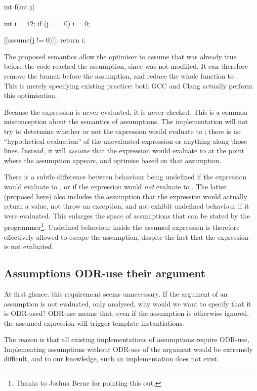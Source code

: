 \begin{codeblock}
int f(int j) {
  int i = 42;
  if (j == 0)
    i = 0;

  [[assume(j != 0)]];
  return i;
}
\end{codeblock}

The proposed semantics allow the optimiser to assume that  was already true before the code reached the assumption, since  was not modified. It can therefore remove the branch before the assumption, and reduce the whole function to . This is merely specifying existing practice: both GCC and Clang actually perform this optimisation.

Because the expression is never evaluated, it is never checked. This is a common misconception about the semantics of assumptions. The implementation will not try to determine whether or not the expression would evaluate to ; there is no ``hypothetical evaluation'' of the unevaluated expression or anything along those lines. Instead, it will \emph{assume} that the expression would evaluate to  at the point where the assumption appears, and optimise based on that assumption.

There is a subtle difference between behaviour being undefined if the expression would evaluate to , or if the expression would \emph{not} evaluate to . The latter (proposed here) also includes the assumption that the expression would actually return a value, not throw an exception, and not exhibit undefined behaviour if it were evaluated. This enlarges the space of assumptions that can be stated by the programmer\footnote{Thanks to Joshua Berne for pointing this out.}. Undefined behaviour inside the assumed expression is therefore effectively allowed to escape the assumption, despite the fact that the expression is not evaluated.

\subsection{Assumptions ODR-use their argument}

At first glance, this requirement seems unnecessary. If the argument of an assumption is not evaluated, only analysed, why would we want to specify that it is ODR-used? ODR-use means that, even if the assumption is otherwise ignored, the assumed expression will trigger template instantiations.

The reason is that all existing implementations of assumptions require ODR-use, Implementing assumptions without ODR-use of the argument would be extremely difficult, and to our knowledge, such an implementation does not exist.

